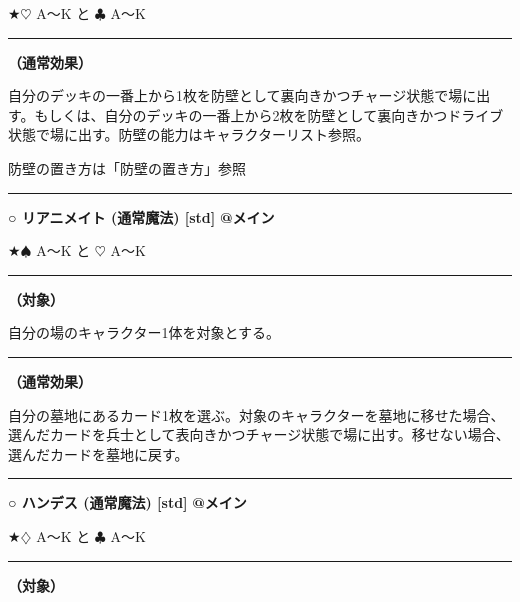 \documentclass[twocolumn,a5paper,papersize,10pt]{jarticle}
\begin{document}
★{\normalsize $\heartsuit$} A〜K と {\normalsize $\clubsuit$} A〜K

\vspace{1mm}%
\hrule height 0.1mm depth 0mm width 66.5mm %
\vspace{1mm}%

{\bf（通常効果）}

自分のデッキの一番上から1枚を防壁として裏向きかつチャージ状態で場に出す。もしくは、自分のデッキの一番上から2枚を防壁として裏向きかつドライブ状態で場に出す。防壁の能力はキャラクターリスト参照。

防壁の置き方は「防壁の置き方」参照
\vspace{2mm} %
\hrule height 0.5mm depth 0mm width 66.5mm %
\vspace{1mm} %
{\normalsize\bf ○ リアニメイト {\scriptsize (通常魔法) [std]}} %
\hfill 
{\small\bf @メイン }

★{\normalsize $\spadesuit$} A〜K と {\normalsize $\heartsuit$} A〜K

\vspace{1mm}%
\hrule height 0.1mm depth 0mm width 66.5mm %
\vspace{1mm}%
{\bf（対象）}

自分の場のキャラクター1体を対象とする。
\vspace{1mm}%
\hrule height 0.1mm depth 0mm width 66.5mm %
\vspace{1mm}%

{\bf（通常効果）}

自分の墓地にあるカード1枚を選ぶ。対象のキャラクターを墓地に移せた場合、選んだカードを兵士として表向きかつチャージ状態で場に出す。移せない場合、選んだカードを墓地に戻す。
\vspace{2mm} %
\hrule height 0.5mm depth 0mm width 66.5mm %
\vspace{1mm} %
{\normalsize\bf ○ ハンデス {\scriptsize (通常魔法) [std]}} %
\hfill 
{\small\bf @メイン }

★{\normalsize $\diamondsuit$} A〜K と {\normalsize $\clubsuit$} A〜K

\vspace{1mm}%
\hrule height 0.1mm depth 0mm width 66.5mm %
\vspace{1mm}%
{\bf（対象）}
\end{document}
